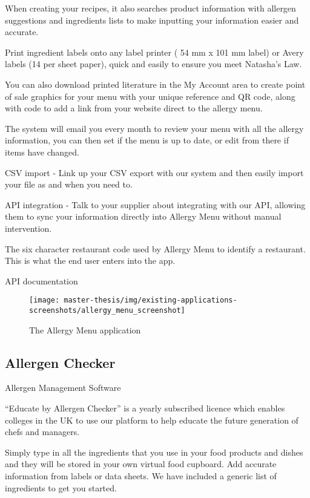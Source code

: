   When creating your recipes, it also searches product information with allergen suggestions and ingredients lists to make inputting your information easier and accurate.

  Print ingredient labels onto any label printer ( 54 mm x 101 mm label) or Avery labels (14 per sheet paper), quick and easily to ensure you meet Natasha's Law.

  You can also download printed literature in the My Account area to create point of sale graphics for your menu with your unique reference and QR code, along with code to add a link from your website direct to the allergy menu.

  The system will email you every month to review your menu with all the allergy information, you can then set if the menu is up to date, or edit from there if items have changed.

  CSV import - Link up your CSV export with our system and then easily import your file as and when you need to.

  API integration - Talk to your supplier about integrating with our API, allowing them to sync your information directly into Allergy Menu without manual intervention.

  The six character restaurant code used by Allergy Menu to identify a restaurant. This is what the end user enters into the app.

  API documentation

  \begin{figure}[h]
    \centering
    \texttt{[image: master-thesis/img/existing-applications-screenshots/allergy\_menu\_screenshot]}
    \caption{The Allergy Menu application}
  \end{figure}

\subsection*{Allergen Checker}
  Allergen Management Software

  “Educate by Allergen Checker” is a yearly subscribed licence which enables colleges in the UK to use our platform to help educate the future generation of chefs and managers.

  Simply type in all the ingredients that you use in your food products and dishes and they will be stored in your own virtual food cupboard. Add accurate information from labels or data sheets. We have included a generic list of ingredients to get you started.  

